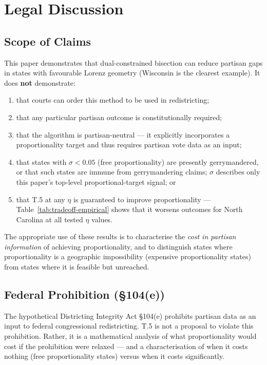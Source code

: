 \section{Legal Discussion}
\label{sec:legal}

\subsection{Scope of Claims}
\label{sec:legal:scope}

This paper demonstrates that dual-constrained bisection can reduce partisan
gaps in states with favourable Lorenz geometry (Wisconsin is the clearest
example).
It does \textbf{not} demonstrate:
\begin{enumerate}
  \item that courts can order this method to be used in redistricting;
  \item that any particular partisan outcome is constitutionally required;
  \item that the algorithm is partisan-neutral --- it explicitly incorporates
    a proportionality target and thus requires partisan vote data as an input;
  \item that states with $\sigma < 0.05$ (free proportionality) are presently
    gerrymandered, or that such states are immune from gerrymandering claims;
    $\sigma$ describes only this paper's top-level proportional-target signal;
    or
  \item that T.5 at any $\eta$ is guaranteed to improve proportionality ---
    Table~\ref{tab:tradeoff-empirical} shows that it worsens outcomes for North
    Carolina at all tested $\eta$ values.
\end{enumerate}
The appropriate use of these results is to characterise the \emph{cost in
partisan information} of achieving proportionality, and to distinguish states
where proportionality is a geographic impossibility (expensive proportionality
states) from states where it is feasible but unreached.

\subsection{Federal Prohibition (\S104(e))}

The hypothetical Districting Integrity Act \S104(e) prohibits partisan data
as an input to federal congressional redistricting.
T.5 is not a proposal to violate this prohibition.
Rather, it is a mathematical analysis of what proportionality would cost if
the prohibition were relaxed --- and a characterisation of when it costs nothing
(free proportionality states) versus when it costs significantly.

